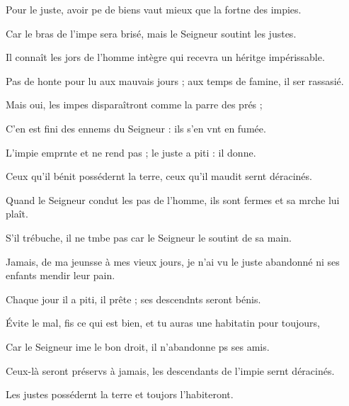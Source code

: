 \item Pour le juste, avoir pe de biens\psstar{} vaut mieux que la fortne des impies.
\item Car le bras de l’impe sera brisé,\psstar{} mais le Seigneur soutint les justes.
\item Il connaît les jors de l’homme intègre\psstar{} qui recevra un héritge impérissable.
\item Pas de honte pour lu aux mauvais jours ;\psstar{} aux temps de famine, il ser rassasié.
\item Mais oui, les impes disparaîtront\psstar{} comme la parre des prés ; 
\item C’en est fini des ennems du Seigneur :\psstar{} ils s’en vnt en fumée.
\item L’impie emprnte et ne rend pas ;\psstar{} le juste a piti : il donne.
\item Ceux qu’il bénit possédernt la terre,\psstar{} ceux qu’il maudit sernt déracinés.
\item Quand le Seigneur condut les pas de l’homme,\psstar{} ils sont fermes et sa mrche lui plaît.
\item S’il trébuche, il ne tmbe pas\psstar{} car le Seigneur le soutint de sa main.
\item Jamais, de ma jeunsse à mes vieux jours,\psstar{} je n’ai vu le juste abandonné ni ses enfants mendir leur pain.
\item Chaque jour il a piti, il prête ;\psstar{} ses descendnts seront bénis.
\item Évite le mal, fis ce qui est bien,\psstar{} et tu auras une habitatin pour toujours,
\item Car le Seigneur ime le bon droit,\psstar{} il n’abandonne ps ses amis. 
\item Ceux-là seront préservs à jamais,\psstar{} les descendants de l’impie sernt déracinés.
\item Les justes possédernt la terre\psstar{} et toujors l’habiteront.